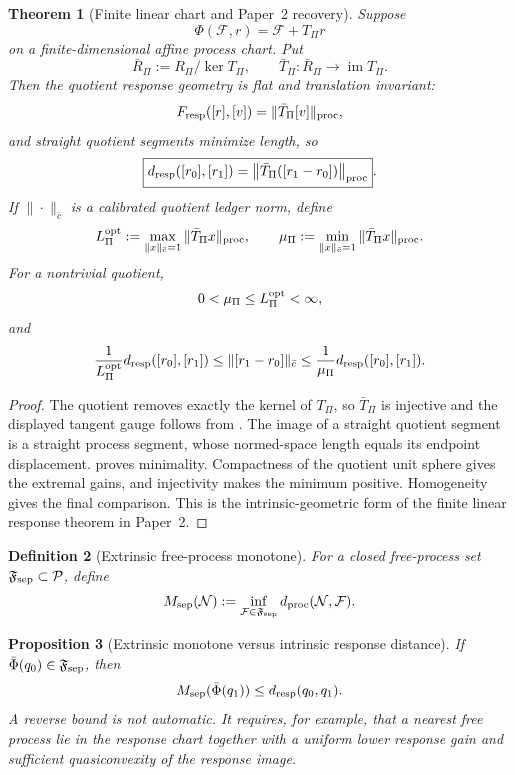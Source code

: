 \documentclass[11pt]{article}
\newtheorem{theorem}{Theorem}[section]
\newtheorem{proposition}[theorem]{Proposition}
\newtheorem{definition}[theorem]{Definition}
\theoremstyle{remark}
\newcommand{\Pproc}{\mathcal P}
\newcommand{\Fresp}{F_{\rm resp}}
\newcommand{\dresp}{d_{\rm resp}}
\newcommand{\dproc}{d_{\rm proc}}
\begin{document}
\begin{theorem}[Finite linear chart and Paper~2 recovery]
\label{thm:linear-flat-response-geometry}
Suppose
\[
        \Phi(\mathcal F,r)=\mathcal F+T_\Pi r
\]
on a finite-dimensional affine process chart.  Put
\[
        \bar R_\Pi:=R_\Pi/\ker T_\Pi,
        \qquad
        \bar T_\Pi:\bar R_\Pi\to\operatorname{im}T_\Pi.
\]
Then the quotient response geometry is flat and translation invariant:
\[
        \Fresp([r],[v])=\|\bar T_\Pi[v]\|_{\rm proc},
\]
and straight quotient segments minimize length, so
\[
        \boxed{
        \dresp([r_0],[r_1])
        =\left\|\bar T_\Pi([r_1-r_0])\right\|_{\rm proc}
        }.
\]
If $\|\cdot\|_{\bar c}$ is a calibrated quotient ledger norm, define
\[
L_\Pi^{\rm opt}:=\max_{\|x\|_{\bar c}=1}\|\bar T_\Pi x\|_{\rm proc},
\qquad
\mu_\Pi:=\min_{\|x\|_{\bar c}=1}\|\bar T_\Pi x\|_{\rm proc}.
\]
For a nontrivial quotient,
\[
0<\mu_\Pi\le L_\Pi^{\rm opt}<\infty,
\]
and
\[
\frac{1}{L_\Pi^{\rm opt}}\dresp([r_0],[r_1])
\le
\|[r_1-r_0]\|_{\bar c}
\le
\frac{1}{\mu_\Pi}\dresp([r_0],[r_1]).
\]
\end{theorem}

\begin{proof}
The quotient removes exactly the kernel of $T_\Pi$, so $\bar T_\Pi$ is injective and the displayed tangent gauge follows from .  The image of a straight quotient segment is a straight process segment, whose normed-space length equals its endpoint displacement.   proves minimality.  Compactness of the quotient unit sphere gives the extremal gains, and injectivity makes the minimum positive.  Homogeneity gives the final comparison.  This is the intrinsic-geometric form of the finite linear response theorem in Paper~2.
\end{proof}

\begin{definition}[Extrinsic free-process monotone]
For a closed free-process set $\mathfrak F_{\rm sep}\subset\Pproc$, define
\[
        M_{\rm sep}(\mathcal N)
        :=\inf_{\mathcal F\in\mathfrak F_{\rm sep}}
        \dproc(\mathcal N,\mathcal F).
\]
\end{definition}

\begin{proposition}[Extrinsic monotone versus intrinsic response distance]
\label{prop:extrinsic-intrinsic}
If $\bar\Phi(q_0)\in\mathfrak F_{\rm sep}$, then
\[
        M_{\rm sep}(\bar\Phi(q_1))\le\dresp(q_0,q_1).
\]
A reverse bound is not automatic.  It requires, for example, that a nearest free process lie in the response chart together with a uniform lower response gain and sufficient quasiconvexity of the response image.
\end{proposition}
\end{document}
